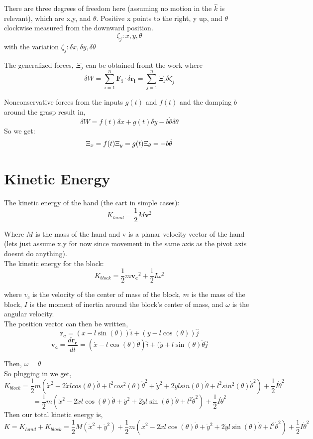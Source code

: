 \documentclass{article}
\begin{document}
There are three degrees of freedom here (assuming no motion in the $\hat{k}$ is relevant), which are x,y, and $\theta$. Positive x points to the right, y up, and $\theta$ clockwise measured from the downward position.  
$$
\zeta_j: x,y, \theta
$$
with the variation $\zeta_j: \delta x, \delta y, \delta \theta$

The generalized forces, $\Xi_j$ can be obtained fromt the work where
$$
\delta W = \overset{n}{\underset{i = 1}{\sum}} \mathbf{F_i} \cdot \delta \mathbf{r_i} = \overset{n}{\underset{j = 1}{\sum}} \Xi_j \delta \zeta_j
$$

Nonconservative forces from the inputs $g(t)$ and $f(t)$ and the damping $b$ around the grasp result in,
$$
\delta W = f(t) \delta x + g(t) \delta y - b \dot{\theta}\delta\theta
$$ 
So we get:
$$
\Xi_x = f(t) \\
\Xi_y = g(t) \\
\Xi_{\theta} = -b\dot{\theta}
$$

\section{Kinetic Energy}

The kinetic energy of the hand (the cart in simple cases): 
$$
K_{hand} = \frac{1}{2}M\mathbf{v}^2
$$

Where $M$ is the mass of the hand and v is a planar velocity vector of the hand (lets just assume x,y for now since movement in the same axis as the pivot axis doesnt do anything). \\

The kinetic energy for the block:
$$
K_{block} = \frac{1}{2} m\mathbf{v_c}^2 + \frac{1}{2} I \omega^2
$$

where $v_c$ is the velocity of the center of mass of the block, $m$ is the mass of the block, $I$ is the moment of inertia around the block's center of mass, and $\omega$ is the angular velocity. \\
The position vector can then be written,
$$
\mathbf{r_c} = (x - l\sin(\theta)) \hat{i} + (y - l\cos(\theta)) \hat{j}
$$
$$
\mathbf{v_c} = \frac{d\mathbf{r_c}}{dt} = (\dot{x} - l \cos(\theta)\dot{\theta}) \hat{i} + (\dot{y} + l\sin(\theta)\dot{\theta} \hat{j}
$$

Then, $\omega = \dot{\theta}$ \\
So plugging in we get, 
$$
K_{block} = \frac{1}{2} m (\dot{x}^2 - 2 \dot{x}lcos(\theta)\dot{\theta} + l^2cos^2(\theta)\dot{\theta}^2 + \dot{y}^2 + 2 \dot{y}lsin(\theta)\dot{\theta} + l^2sin^2(\theta)\dot{\theta}^2) + \frac{1}{2} I \dot{\theta}^2
$$
$$
 =  \frac{1}{2} m (\dot{x}^2 - 2 \dot{x}l\cos(\theta)\dot{\theta} + \dot{y}^2 + 2 \dot{y}l\sin(\theta)\dot{\theta} + l^2\dot{\theta}^2) + \frac{1}{2} I \dot{\theta}^2
$$
Then our total kinetic energy is, 
$$
K = K_{hand} + K_{block} = \frac{1}{2} M(\dot{x}^2+\dot{y}^2) + \frac{1}{2} m (\dot{x}^2 - 2 \dot{x}l\cos(\theta)\dot{\theta} + \dot{y}^2 + 2 \dot{y}l\sin(\theta)\dot{\theta} + l^2\dot{\theta}^2) + \frac{1}{2} I \dot{\theta}^2
$$
\end{document}

